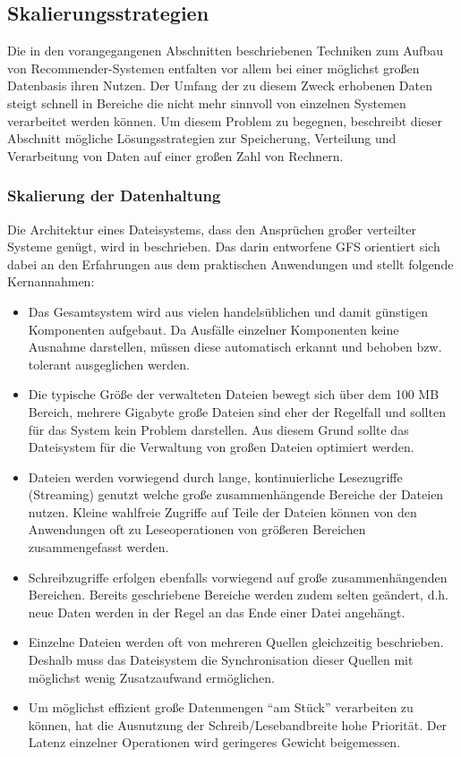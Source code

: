 \subsection{Skalierungsstrategien}
\label{sec:scale}

Die in den vorangegangenen Abschnitten beschriebenen Techniken zum Aufbau von Recommender-Systemen entfalten vor allem bei einer möglichst großen Datenbasis ihren Nutzen. Der Umfang der zu diesem Zweck erhobenen Daten steigt schnell in Bereiche die nicht mehr sinnvoll von einzelnen Systemen verarbeitet werden können.  Um  diesem Problem zu begegnen, beschreibt dieser Abschnitt mögliche Lösungsstrategien zur Speicherung, Verteilung und Verarbeitung von Daten auf einer großen Zahl von Rechnern. 

\subsubsection{Skalierung der Datenhaltung}\label{sec:hfs}

Die Architektur eines Dateisystems, dass den Ansprüchen großer verteilter Systeme genügt, wird in \citep{ghemawat03} beschrieben. Das darin entworfene \acf{GFS} orientiert sich dabei an den Erfahrungen aus dem praktischen Anwendungen und stellt folgende Kernannahmen:

\begin{itemize}
\item Das Gesamtsystem wird aus vielen handelsüblichen und damit günstigen Komponenten aufgebaut. Da Ausfälle einzelner Komponenten keine Ausnahme darstellen, müssen diese automatisch erkannt und behoben bzw. tolerant ausgeglichen werden.
\item Die typische Größe der verwalteten Dateien bewegt sich über dem 100 MB Bereich, mehrere Gigabyte große Dateien sind eher der Regelfall und sollten für das System kein Problem darstellen. Aus diesem Grund sollte das Dateisystem für die Verwaltung von großen Dateien optimiert werden. 
\item Dateien werden vorwiegend durch lange, kontinuierliche Lesezugriffe (Streaming) genutzt welche große zusammenhängende Bereiche der Dateien nutzen. Kleine wahlfreie Zugriffe auf Teile der Dateien können von den Anwendungen oft zu Leseoperationen von größeren Bereichen zusammengefasst werden.
\item Schreibzugriffe erfolgen ebenfalls vorwiegend auf große zusammenhängenden Bereichen. Bereits geschriebene Bereiche werden zudem selten geändert, d.h. neue Daten werden in der Regel an das Ende einer Datei angehängt.
\item Einzelne Dateien werden oft von mehreren Quellen gleichzeitig beschrieben. Deshalb muss das Dateisystem die Synchronisation dieser Quellen mit möglichst wenig Zusatzaufwand ermöglichen.
\item Um möglichst effizient große Datenmengen ``am Stück'' verarbeiten zu können, hat die Ausnutzung der Schreib/Lesebandbreite hohe Priorität. Der Latenz einzelner Operationen wird geringeres Gewicht beigemessen.
\end{itemize}

